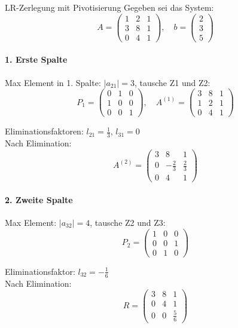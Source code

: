 \begin{example2}{LR-Zerlegung mit Pivotisierung}
Gegeben sei das System:
$$A = \begin{pmatrix}
1 & 2 & 1\\
3 & 8 & 1\\
0 & 4 & 1
\end{pmatrix}, \quad b = \begin{pmatrix}
2\\
3\\
5
\end{pmatrix}$$

\paragraph{1. Erste Spalte}
Max Element in 1. Spalte: $|a_{21}| = 3$, tausche Z1 und Z2:
$$P_1 = \begin{pmatrix}
0 & 1 & 0\\
1 & 0 & 0\\
0 & 0 & 1
\end{pmatrix}, \quad 
A^{(1)} = \begin{pmatrix}
3 & 8 & 1\\
1 & 2 & 1\\
0 & 4 & 1
\end{pmatrix}$$

Eliminationsfaktoren: $l_{21} = \frac{1}{3}$, $l_{31} = 0$\\
Nach Elimination:
$$A^{(2)} = \begin{pmatrix}
3 & 8 & 1\\
0 & -\frac{2}{3} & \frac{2}{3}\\
0 & 4 & 1
\end{pmatrix}$$

\paragraph{2. Zweite Spalte}
Max Element: $|a_{32}| = 4$, tausche Z2 und Z3:
$$P_2 = \begin{pmatrix}
1 & 0 & 0\\
0 & 0 & 1\\
0 & 1 & 0
\end{pmatrix}$$

Eliminationsfaktor: $l_{32} = -\frac{1}{6}$\\
Nach Elimination:
$$R = \begin{pmatrix}
3 & 8 & 1\\
0 & 4 & 1\\
0 & 0 & \frac{5}{6}
\end{pmatrix}$$


\end{example2}
